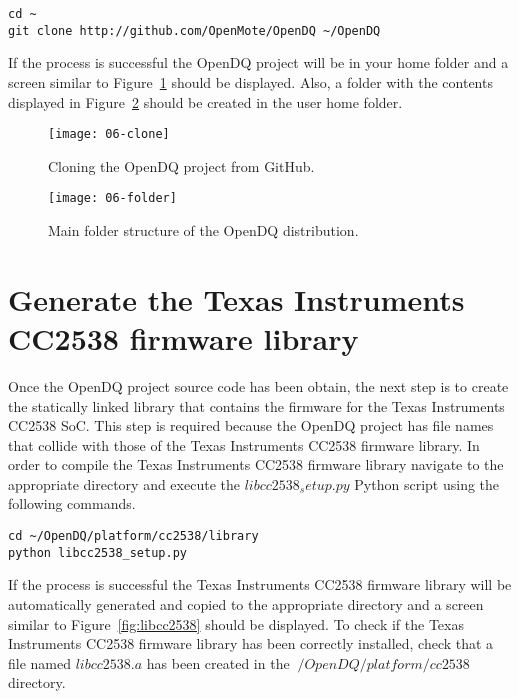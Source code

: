 \begin{verbatim}
cd ~
git clone http://github.com/OpenMote/OpenDQ ~/OpenDQ
\end{verbatim}

If the process is successful the OpenDQ project will be in your home folder and a screen similar to Figure~\ref{fig:06-clone} should be displayed. Also, a folder with the contents displayed in Figure~\ref{fig:06-folder} should be created in the user home folder.

\begin{figure}[!ht]
    \centering
	\texttt{[image: 06-clone]}
    \caption{Cloning the OpenDQ project from GitHub.}
    \label{fig:06-clone}
\end{figure}

\begin{figure}[!ht]
    \centering
	\texttt{[image: 06-folder]}
    \caption{Main folder structure of the OpenDQ distribution.}
    \label{fig:06-folder}
\end{figure}

\section{Generate the Texas Instruments CC2538 firmware library}
Once the OpenDQ project source code has been obtain, the next step is to create the statically linked library that contains the firmware for the Texas Instruments CC2538 SoC. This step is required because the OpenDQ project has file names that collide with those of the Texas Instruments CC2538 firmware library. In order to compile the Texas Instruments CC2538 firmware library navigate to the appropriate directory and execute the $libcc2538_setup.py$ Python script using the following commands.

\begin{verbatim}
cd ~/OpenDQ/platform/cc2538/library
python libcc2538_setup.py
\end{verbatim}

If the process is successful the Texas Instruments CC2538 firmware library will be automatically generated and copied to the appropriate directory and a screen similar to Figure~\ref{fig:libcc2538} should be displayed. To check if the Texas Instruments CC2538 firmware library has been correctly installed, check that a file named $libcc2538.a$ has been created in the $~/OpenDQ/platform/cc2538$ directory.

